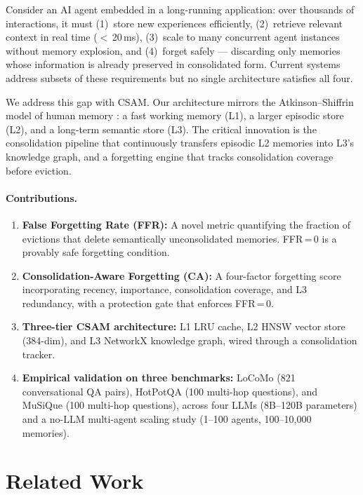 \documentclass{article}
\begin{document}
Consider an AI agent embedded in a long-running application: over thousands of
interactions, it must (1)~store new experiences efficiently, (2)~retrieve
relevant context in real time ($<$\,20\,ms), (3)~scale to many concurrent
agent instances without memory explosion, and (4)~forget safely — discarding
only memories whose information is already preserved in consolidated form.
Current systems address subsets of these requirements but no single architecture
satisfies all four.

We address this gap with CSAM.  Our architecture mirrors the Atkinson–Shiffrin
model of human memory \citep{atkinson1968}: a fast working memory (L1), a
larger episodic store (L2), and a long-term semantic store (L3).  The critical
innovation is the consolidation pipeline that continuously transfers episodic
L2 memories into L3's knowledge graph, and a forgetting engine that tracks
consolidation coverage before eviction.

\paragraph{Contributions.}
\begin{enumerate}
\item \textbf{False Forgetting Rate (FFR):} A novel metric quantifying the
      fraction of evictions that delete semantically unconsolidated memories.
      FFR\,=\,0 is a provably safe forgetting condition.
\item \textbf{Consolidation-Aware Forgetting (CA):} A four-factor forgetting
      score incorporating recency, importance, consolidation coverage, and L3
      redundancy, with a protection gate that enforces FFR\,=\,0.
\item \textbf{Three-tier CSAM architecture:} L1 LRU cache, L2 HNSW vector
      store (384-dim), and L3 NetworkX knowledge graph, wired through a
      consolidation tracker.
\item \textbf{Empirical validation on three benchmarks:} LoCoMo (821
      conversational QA pairs), HotPotQA (100 multi-hop questions), and
      MuSiQue (100 multi-hop questions), across four LLMs (8B–120B parameters)
      and a no-LLM multi-agent scaling study (1–100 agents, 100–10,000
      memories).
\end{enumerate}

\section{Related Work}
\label{sec:related}
\end{document}
